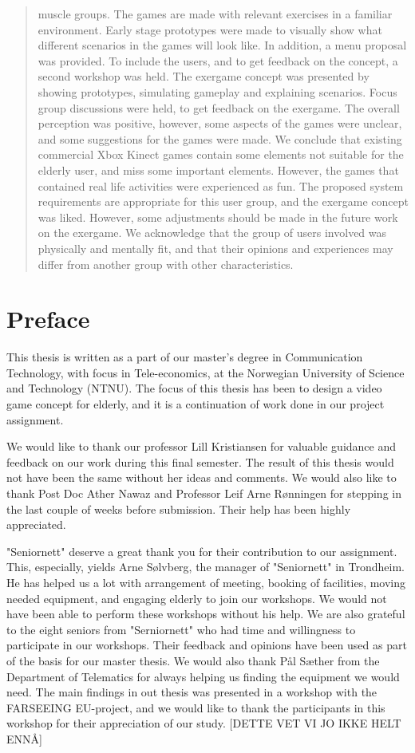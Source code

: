 \documentclass[b5paper,twoside,openright,11pt]{report}
\begin{document}
\begin{abstract}
muscle groups. The games are made with relevant exercises in a familiar environment. Early stage prototypes were made to visually show what different scenarios in the games will look like. In addition, a menu proposal was provided. To include the users, and to get feedback on the concept, a second workshop was held.  The exergame concept was presented by showing prototypes, simulating gameplay and explaining scenarios. Focus group discussions were held, to get feedback on the exergame. The overall perception was positive, however, some aspects of the games were unclear, and some suggestions for the games were made. We conclude that existing commercial Xbox Kinect games contain some elements not suitable for the elderly user, and miss some important elements. However, the games that contained real life activities were experienced as fun. The proposed system requirements are appropriate for this user group, and the exergame concept was liked. However, some adjustments should be made in the future work on the exergame. We acknowledge that the group of users involved was physically and mentally fit, and that their opinions and experiences may differ from another group with other characteristics.




\end{abstract}
\cleardoublepage
\chapter*{Preface}
This thesis is written as a part of our master's degree in Communication Technology, with focus in Tele-economics, at the Norwegian University of Science and Technology (NTNU). The focus of this thesis has been to design a video game concept for elderly, and it is a continuation of work done in our project assignment. 

We would like to thank our professor Lill Kristiansen for valuable guidance and feedback on our work during this final semester. The result of this thesis would not have been the same without her ideas and comments. We would also like to thank Post Doc Ather Nawaz and Professor Leif Arne Rønningen for stepping in the last couple of weeks before submission. Their help has been highly appreciated.  

"Seniornett" deserve a great thank you for their contribution to our assignment. This, especially, yields Arne Sølvberg, the manager of "Seniornett" in Trondheim. He has helped us a lot with arrangement of meeting, booking of facilities, moving needed equipment, and engaging elderly to join our workshops. We would not have been able to perform these workshops without his help. We are also grateful to the eight seniors from "Serniornett" who had time and willingness to participate in our workshops. Their feedback and opinions have been used as part of the basis for our master thesis. We would also thank Pål Sæther from the Department of Telematics for always helping us finding the equipment we would need. The main findings in out thesis was presented in a workshop with the FARSEEING EU-project, and we would like to thank the participants in this workshop for their appreciation of our study. [DETTE VET VI JO IKKE HELT ENNÅ]       
\end{document}
